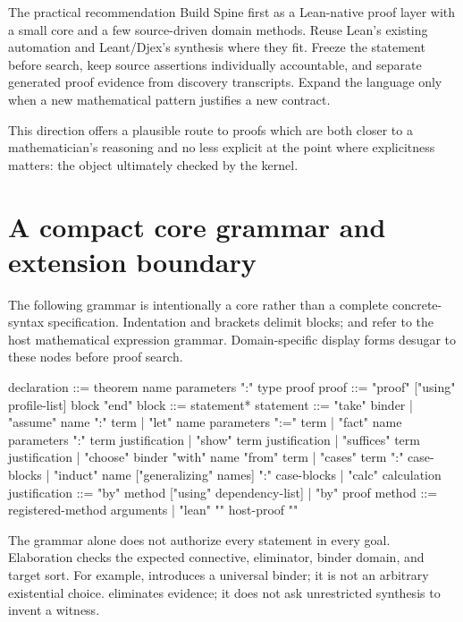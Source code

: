 \documentclass[11pt,letterpaper]{article}
\theoremstyle{definition}
\theoremstyle{remark}
\newcommand{\Spine}{Spine}
\newcommand{\code}[1]{\texttt{\detokenize{#1}}}
\begin{document}
\begin{principle}{The practical recommendation}
Build \Spine{} first as a Lean-native proof layer with a small core and a few source-driven domain methods. Reuse Lean's existing automation and Leant/Djex's synthesis where they fit. Freeze the statement before search, keep source assertions individually accountable, and separate generated proof evidence from discovery transcripts. Expand the language only when a new mathematical pattern justifies a new contract.
\end{principle}

This direction offers a plausible route to proofs which are both closer to a mathematician's reasoning and no less explicit at the point where explicitness matters: the object ultimately checked by the kernel.

\appendix
\section{A compact core grammar and extension boundary}
\label{app:grammar}
The following grammar is intentionally a core rather than a complete concrete-syntax specification. Indentation and brackets delimit blocks; \code{term} and \code{type} refer to the host mathematical expression grammar. Domain-specific display forms desugar to these nodes before proof search.
\par\noindent\begin{minipage}{\linewidth}
\begin{Code}
declaration ::= theorem name parameters ":" type proof
proof       ::= "proof" ["using" profile-list] block "end"
block       ::= statement*
statement   ::= "take" binder
              | "assume" name ":" term
              | "let" name parameters ":=" term
              | "fact" name parameters ":" term justification
              | "show" term justification
              | "suffices" term justification
              | "choose" binder "with" name "from" term
              | "cases" term ":" case-blocks
              | "induct" name ["generalizing" names] ":" case-blocks
              | "calc" calculation
justification ::= "by" method ["using" dependency-list]
                | "by" proof
method      ::= registered-method arguments
              | "lean" "{" host-proof "}"
\end{Code}
\end{minipage}\par\smallskip
The grammar alone does not authorize every statement in every goal. Elaboration checks the expected connective, eliminator, binder domain, and target sort. For example, \code{take} introduces a universal binder; it is not an arbitrary existential choice. \code{choose ... from ...} eliminates evidence; it does not ask unrestricted synthesis to invent a witness.
\end{document}
